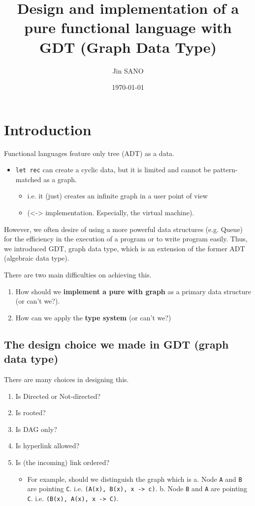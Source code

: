 \documentclass[11pt]{article}
\author{Jin SANO}
\date{\today}
\title{Design and implementation of a pure functional language with GDT (Graph Data Type)}
\begin{document}
\maketitle
\tableofcontents


\section{Introduction}
\label{sec:orga5b7697}

Functional languages feature only tree (ADT) as a data.
\begin{itemize}
\item \texttt{let rec} can create a cyclic data, but it is limited and cannot be pattern-matched as a graph.
\begin{itemize}
\item i.e. it (just) creates an infinite graph in a user point of view
\item (<-> implementation. Especially, the virtual machine).
\end{itemize}
\end{itemize}


However, we often desire of using a more powerful data structures (e.g. Queue)
for the efficiency in the execution of a program
or to write program easily.
Thus, we introduced GDT, graph data type, which is an extension of the former ADT (algebraic data type).

There are two main difficulties on achieving this.
\begin{enumerate}
\item How should we \textbf{implement a pure with graph} as a primary data structure (or can't we?).
\item How can we apply the \textbf{type system} (or can't we?)
\end{enumerate}


\subsection{The design choice we made in GDT (graph data type)}
\label{sec:orge66adc9}

There are many choices in designing this.
\begin{enumerate}
\item Is Directed or Not-directed?
\item Is rooted?
\item Is DAG only?
\item Is hyperlink allowed?
\item Is (the incoming) link ordered?
\begin{itemize}
\item For example, should we distinguish the graph which is
a. Node \texttt{A} and \texttt{B} are pointing \texttt{C}. i.e. \texttt{(A(x), B(x), x -> c)}.
b. Node \texttt{B} and \texttt{A} are pointing \texttt{C}. i.e. \texttt{(B(x), A(x), x -> C)}.
\end{itemize}
\end{enumerate}
\end{document}
